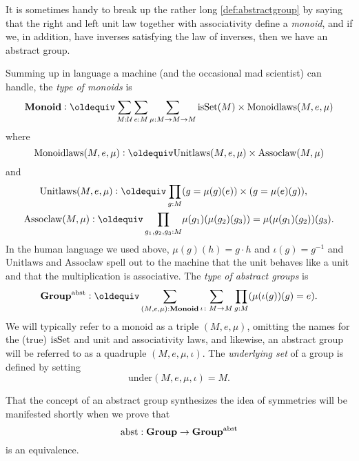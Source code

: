   \begin{remark}
    It is sometimes handy to break up the rather long \cref{def:abstractgroup}  by saying that the right and left unit law together with associativity define a \emph{monoid}, and if we, in addition, have inverses satisfying the law of inverses, then we have an abstract group.


      \label{rem:typemonoidabstrgp}
        Summing up in language a machine (and the occasional mad scientist) can handle, the \emph{type of monoids} is
$$\typemonoid\defequi \sum_{M:\UU}\sum_{e:M}\sum_{\mu{}:M\to M\to M}
\isset{(M)}\times\mathrm{Monoidlaws}(M,e,\mu)
$$
where
$$\mathrm{Monoidlaws}(M,e,\mu)\defequi\mathrm{Unitlaws}(M,e,\mu)\times\mathrm{Assoclaw}(M,\mu{})$$and
\begin{align*}
  \mathrm{Unitlaws}(M,e,\mu)\defequi\prod_{g:M}
&(g=\mu{}(g)(e))\times(g=\mu{}(e)(g)),\\
\mathrm{Assoclaw}(M,\mu{})\defequi\prod_{g_1,g_2,g_3:M}&\mu{}(g_1)(\mu{}(g_2)(g_3))=\mu{}(\mu{}(g_1)(g_2))(g_3).
\end{align*}
In the human language we used above, $\mu(g)(h)=g\cdot h$ and $\iota(g)=g^{-1}$ and $\mathrm{Unitlaws}$ and $\mathrm{Assoclaw}$ spell out to the machine that the unit behaves like a unit and that the multiplication is associative.
The
\emph{type of abstract groups} is
$$%
\typegroup^\abstr\defequi
\sum_{(M,e,\mu):\typemonoid}\sum_{\iota\colon M\to M}\prod_{g:M}(\mu{}(\iota{}(g))(g)=e).$$
We will typically refer to a monoid as a triple $(M,e,\mu)$, omitting the names for the (true) $\mathrm{isSet}$ and unit and associativity laws, and likewise, an abstract group will be referred to as a quadruple $(M,e,\mu,\iota)$.  The \emph{underlying set} of a group is defined by setting 
$$\mathrm{under}(M,e,\mu,\iota)=M.$$
\end{remark}
\begin{remark}
  That the concept of an abstract group synthesizes the idea of symmetries will be manifested shortly when we prove that 
$$\mathrm{abst}:\mathbf{Group}\to\mathbf{Group}^{\mathrm{abst}}$$
is an equivalence.
\end{remark}
